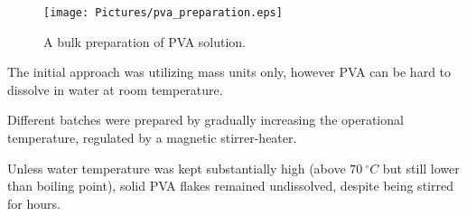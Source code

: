 \documentclass{article}
\begin{document}
%
%
%
%
%
%
%



                \begin{figure}[h!]
                    \centering
                    \texttt{[image: Pictures/pva\_preparation.eps]}
                    \caption{A bulk preparation of PVA solution.}
                    \label{fig:PVA}
                \end{figure}

        The initial approach was utilizing mass units only, however PVA can be hard to dissolve in water at room temperature. 
        
        Different batches were prepared by gradually increasing the operational temperature, regulated by a magnetic stirrer-heater. 

        Unless water temperature was kept substantially high (above $70 \ ^{\circ}C $ but still lower than boiling point), 
        solid PVA flakes remained undissolved, despite being stirred for hours. 
\end{document}
